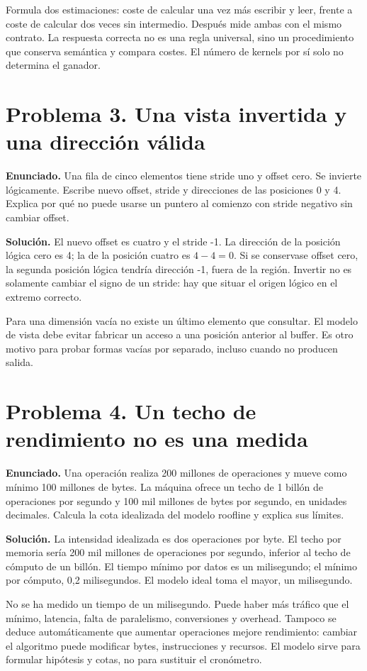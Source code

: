 \documentclass[12pt,a4paper,oneside]{report}
\begin{document}
Formula dos estimaciones: coste de calcular una vez más escribir y leer, frente a coste de calcular dos veces sin intermedio. Después mide ambas con el mismo contrato. La respuesta correcta no es una regla universal, sino un procedimiento que conserva semántica y compara costes. El número de kernels por sí solo no determina el ganador.

\section{Problema 3. Una vista invertida y una dirección válida}
\textbf{Enunciado.} Una fila de cinco elementos tiene stride uno y offset cero. Se invierte lógicamente. Escribe nuevo offset, stride y direcciones de las posiciones 0 y 4. Explica por qué no puede usarse un puntero al comienzo con stride negativo sin cambiar offset.

\textbf{Solución.} El nuevo offset es cuatro y el stride -1. La dirección de la posición lógica cero es 4; la de la posición cuatro es $4-4=0$. Si se conservase offset cero, la segunda posición lógica tendría dirección -1, fuera de la región. Invertir no es solamente cambiar el signo de un stride: hay que situar el origen lógico en el extremo correcto.

Para una dimensión vacía no existe un último elemento que consultar. El modelo de vista debe evitar fabricar un acceso a una posición anterior al buffer. Es otro motivo para probar formas vacías por separado, incluso cuando no producen salida.

\section{Problema 4. Un techo de rendimiento no es una medida}
\textbf{Enunciado.} Una operación realiza 200 millones de operaciones y mueve como mínimo 100 millones de bytes. La máquina ofrece un techo de 1 billón de operaciones por segundo y 100 mil millones de bytes por segundo, en unidades decimales. Calcula la cota idealizada del modelo roofline y explica sus límites.

\textbf{Solución.} La intensidad idealizada es dos operaciones por byte. El techo por memoria sería 200 mil millones de operaciones por segundo, inferior al techo de cómputo de un billón. El tiempo mínimo por datos es un milisegundo; el mínimo por cómputo, 0,2 milisegundos. El modelo ideal toma el mayor, un milisegundo.

No se ha medido un tiempo de un milisegundo. Puede haber más tráfico que el mínimo, latencia, falta de paralelismo, conversiones y overhead. Tampoco se deduce automáticamente que aumentar operaciones mejore rendimiento: cambiar el algoritmo puede modificar bytes, instrucciones y recursos. El modelo sirve para formular hipótesis y cotas, no para sustituir el cronómetro. \cite{roofline}
\end{document}
